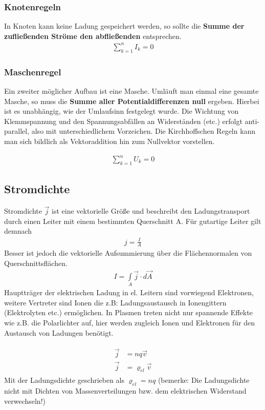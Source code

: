 \subsubsection{Knotenregeln}
In Knoten kann keine Ladung gespeichert werden, so sollte die \textbf{Summe der zufließenden Ströme den abfließenden }entsprechen. 
\begin{align} \label{eqn:Knotenregel}
\boxed{\sum \limits_{k=1}^n I_k = 0}
\end{align}

\subsubsection{Maschenregel}
Ein zweiter möglicher Aufbau ist eine Masche. Umläuft man einmal eine gesamte Masche, so muss die \textbf{Summe aller Potentialdifferenzen null} ergeben. Hierbei ist es unabhängig, wie der Umlaufsinn festgelegt wurde.
Die Wichtung von Klemmspannung und den Spannungsabfällen an Widerständen (etc.) erfolgt anti-parallel, also mit unterschiedlichem Vorzeichen. Die Kirchhoffschen Regeln kann man sich bildlich als Vektoraddition hin zum Nullvektor vorstellen.

\begin{align} \label{eqn:Maschenregel}
\boxed{\sum \limits_{k=1}^n U_k = 0}
\end{align}

\subsection{Stromdichte}
Stromdichte $\vec{j}$ ist eine vektorielle Größe und beschreibt den Ladungstransport durch einen Leiter mit einem bestimmten Querschnitt A. Für gutartige Leiter gilt demnach
 \begin{align*}
j = \frac{I}{A}
\end{align*}
Besser ist jedoch die vektorielle Aufsummierung über die Flächennormalen von Querschnittsflächen. 
\begin{align} 
\boxed{I = \int \limits_A \vec{j} \cdot d\vec{A}}
\end{align}
Hauptträger der elektrischen Ladung in el. Leitern sind vorwiegend Elektronen, weitere Vertreter sind Ionen die z.B: Ladungsaustausch in Ionengittern (Elektrolyten etc.) ermöglichen. In Plasmen treten nicht nur spannende Effekte wie z.B. die Polarlichter auf, hier werden zugleich Ionen und Elektronen für den Austausch von Ladungen benötigt.

\begin{align} \label{eqn:Stromdichte}\begin{split}
\vec{j} &= nq\vec{v} \\
\vec{j}	&= \varrho_{el}\vec{v}
\end{split}
\end{align}
Mit der Ladungsdichte geschrieben als $\varrho_{el} = nq$ (bemerke: Die Ladungsdichte nicht mit Dichten von Massenverteilungen bzw. dem elektrischen Widerstand verwechseln!)

